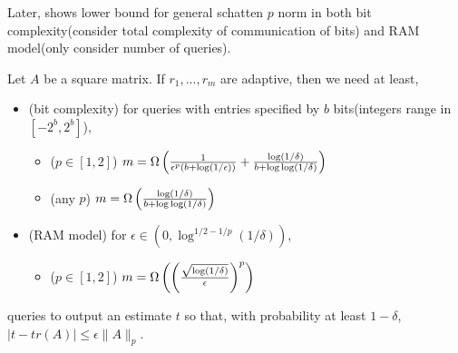 Later, \cite{woodruff2022optimal} shows lower bound for general schatten $p$ norm in both bit complexity(consider total complexity of communication of bits) and RAM model(only consider number of queries).
\begin{thm}
\label{tr_est_ada_schatten_p}
Let $A$ be a square matrix. If $r_1,...,r_m$ are adaptive,
then we need at least, 
\begin{itemize}
    \item (bit complexity) for queries with entries specified by $b$ bits(integers range in $[-2^b,2^b]$),
    \begin{itemize}
        \item ($p\in[1,2]$) $m=\Omega\left(\frac{1}{\epsilon^p(b+\log(1/\epsilon))}+\frac{\log(1/\delta)}{b+\log\log(1/\delta)}\right)$ 
        \item (any $p$) $m=\Omega\left(\frac{\log(1/\delta)}{b+\log\log(1/\delta)}\right)$ 
    \end{itemize}
    \item (RAM model) for $\epsilon\in(0,\log^{1/2-1/p}(1/\delta))$,
    \begin{itemize}
        \item ($p\in[1,2]$) $m=\Omega\left(\left(\frac{\sqrt{\log(1/\delta)}}{\epsilon}\right)^p\right)$ 
    \end{itemize}
\end{itemize}
queries  to output an estimate $t$ so that, with probability at least $1-\delta$, $|t-tr(A)|\le \epsilon \|A\|_p$. 
\end{thm}
